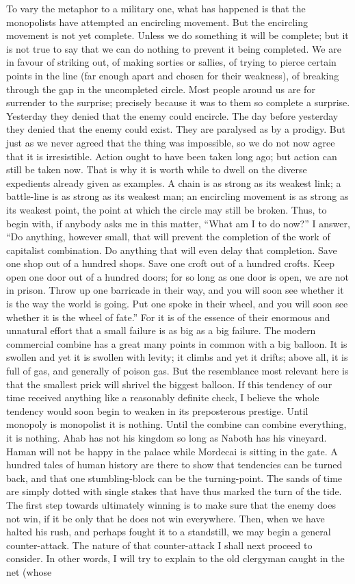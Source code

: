 \documentclass{book}
\begin{document}
To vary the metaphor to a military one, what has happened is that the monopolists have attempted an encircling movement. But the encircling movement is not yet complete. Unless we do something it will be complete; but it is not true to say that we can do nothing to prevent it being completed. We are in favour of striking out, of making sorties or sallies, of trying to pierce certain points in the line (far enough apart and chosen for their weakness), of breaking through the gap in the uncompleted circle. Most people around us are for surrender to the surprise; precisely because it was to them so complete a surprise. Yesterday they denied that the enemy could encircle. The day before yesterday they denied that the enemy could exist. They are paralysed as by a prodigy. But just as we never agreed that the thing was impossible, so we do not now agree that it is irresistible. Action ought to have been taken long ago; but action can still be taken now. That is why it is worth while to dwell on the diverse expedients already given as examples. A chain is as strong as its weakest link; a battle-line is as strong as its weakest man; an encircling movement is as strong as its weakest point, the point at which the circle may still be broken. Thus, to begin with, if anybody asks me in this matter, “What am I to do now?” I answer, “Do anything, however small, that will prevent the completion of the work of capitalist combination. Do anything that will even delay that completion. Save one shop out of a hundred shops. Save one croft out of a hundred crofts. Keep open one door out of a hundred doors; for so long as one door is open, we are not in prison. Throw up one barricade in their way, and you will soon see whether it is the way the world is going. Put one spoke in their wheel, and you will soon see whether it is the wheel of fate.” For it is of the essence of their enormous and unnatural effort that a small failure is as big as a big failure. The modern commercial combine has a great many points in common with a big balloon. It is swollen and yet it is swollen with levity; it climbs and yet it drifts; above all, it is full of gas, and generally of poison gas. But the resemblance most relevant here is that the smallest prick will shrivel the biggest balloon. If this tendency of our time received anything like a reasonably definite check, I believe the whole tendency would soon begin to weaken in its preposterous prestige. Until monopoly is monopolist it is nothing. Until the combine can combine everything, it is nothing. Ahab has not his kingdom so long as Naboth has his vineyard. Haman will not be happy in the palace while Mordecai is sitting in the gate. A hundred tales of human history are there to show that tendencies can be turned back, and that one stumbling-block can be the turning-point. The sands of time are simply dotted with single stakes that have thus marked the turn of the tide. The first step towards ultimately winning is to make sure that the enemy does not win, if it be only that he does not win everywhere. Then, when we have halted his rush, and perhaps fought it to a standstill, we may begin a general counter-attack. The nature of that counter-attack I shall next proceed to consider. In other words, I will try to explain to the old clergyman caught in the net (whose 
\end{document}
